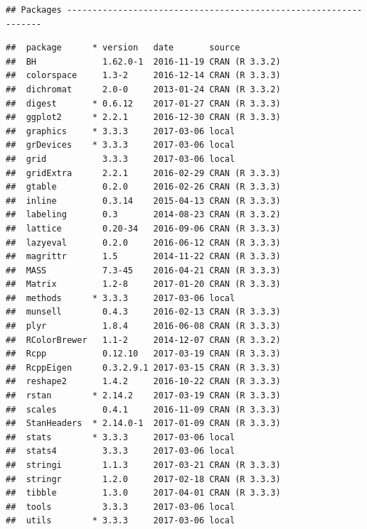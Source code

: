 \documentclass[]{article}
\begin{document}
\begin{verbatim}
## Packages -----------------------------------------------------------------
\end{verbatim}

\begin{verbatim}
##  package      * version   date       source        
##  BH             1.62.0-1  2016-11-19 CRAN (R 3.3.2)
##  colorspace     1.3-2     2016-12-14 CRAN (R 3.3.3)
##  dichromat      2.0-0     2013-01-24 CRAN (R 3.3.2)
##  digest       * 0.6.12    2017-01-27 CRAN (R 3.3.3)
##  ggplot2      * 2.2.1     2016-12-30 CRAN (R 3.3.3)
##  graphics     * 3.3.3     2017-03-06 local         
##  grDevices    * 3.3.3     2017-03-06 local         
##  grid           3.3.3     2017-03-06 local         
##  gridExtra      2.2.1     2016-02-29 CRAN (R 3.3.3)
##  gtable         0.2.0     2016-02-26 CRAN (R 3.3.3)
##  inline         0.3.14    2015-04-13 CRAN (R 3.3.3)
##  labeling       0.3       2014-08-23 CRAN (R 3.3.2)
##  lattice        0.20-34   2016-09-06 CRAN (R 3.3.3)
##  lazyeval       0.2.0     2016-06-12 CRAN (R 3.3.3)
##  magrittr       1.5       2014-11-22 CRAN (R 3.3.3)
##  MASS           7.3-45    2016-04-21 CRAN (R 3.3.3)
##  Matrix         1.2-8     2017-01-20 CRAN (R 3.3.3)
##  methods      * 3.3.3     2017-03-06 local         
##  munsell        0.4.3     2016-02-13 CRAN (R 3.3.3)
##  plyr           1.8.4     2016-06-08 CRAN (R 3.3.3)
##  RColorBrewer   1.1-2     2014-12-07 CRAN (R 3.3.2)
##  Rcpp           0.12.10   2017-03-19 CRAN (R 3.3.3)
##  RcppEigen      0.3.2.9.1 2017-03-15 CRAN (R 3.3.3)
##  reshape2       1.4.2     2016-10-22 CRAN (R 3.3.3)
##  rstan        * 2.14.2    2017-03-19 CRAN (R 3.3.3)
##  scales         0.4.1     2016-11-09 CRAN (R 3.3.3)
##  StanHeaders  * 2.14.0-1  2017-01-09 CRAN (R 3.3.3)
##  stats        * 3.3.3     2017-03-06 local         
##  stats4         3.3.3     2017-03-06 local         
##  stringi        1.1.3     2017-03-21 CRAN (R 3.3.3)
##  stringr        1.2.0     2017-02-18 CRAN (R 3.3.3)
##  tibble         1.3.0     2017-04-01 CRAN (R 3.3.3)
##  tools          3.3.3     2017-03-06 local         
##  utils        * 3.3.3     2017-03-06 local
\end{verbatim}
\end{document}
